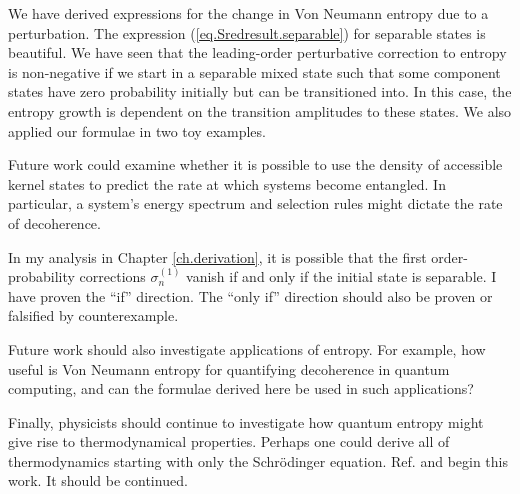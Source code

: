 We have derived expressions for the change in Von Neumann entropy due to a perturbation. The expression (\ref{eq.Sredresult.separable}) for separable states is beautiful. We have seen that the leading-order perturbative correction to entropy is non-negative if we start in a separable mixed state such that some component states have zero probability initially but can be transitioned into. In this case, the entropy growth is dependent on the transition amplitudes to these states. We also applied our formulae in two toy examples.

Future work could examine whether it is possible to use the density of accessible kernel states to predict the rate at which systems become entangled. In particular, a system’s energy spectrum and selection rules might dictate the rate of decoherence.

In my analysis in Chapter \ref{ch.derivation}, it is possible that the first order-probability corrections \(\sigma_n^{(1)}\) vanish if and only if the initial state is separable. I have proven the ``if'' direction. The ``only if'' direction should also be proven or falsified by counterexample.

Future work should also investigate applications of entropy. For example, how useful is Von Neumann entropy for quantifying decoherence in quantum computing, and can the formulae derived here be used in such applications? 

Finally, physicists should continue to investigate how quantum entropy might give rise to thermodynamical properties. Perhaps one could derive all of thermodynamics starting with only the Schrödinger equation. Ref. \cite{bracken} and \cite{heusler} begin this work. It should be continued.
